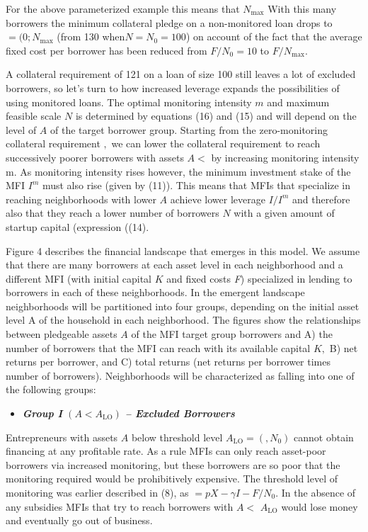 \documentclass[letterpaper, 12pt]{article}
\begin{document}
For the above parameterized example this means that \(N_{\max}\) With
this many borrowers the minimum collateral pledge on a non-monitored
loan drops to \(= (0;N_{\max}\) (from 130 when\(N = N_{0} = 100\)) on
account of the fact that the average fixed cost per borrower has been
reduced from \(F/N_{0} = 10\) to \(F/N_{\max}\).

A collateral requirement of 121 on a loan of size 100 still leaves a lot
of excluded borrowers, so let's turn to how increased leverage expands
the possibilities of using monitored loans. The optimal monitoring
intensity \(m\) and maximum feasible scale \(N\) is determined by
equations (16) and (15) and will depend on the level of \(A\) of the
target borrower group. Starting from the zero-monitoring collateral
requirement \(,\) we can lower the collateral requirement to reach
successively poorer borrowers with assets \(A <\) by increasing
monitoring intensity \(\text{m.}\) As monitoring intensity rises
however, the minimum investment stake of the MFI \(I^{m}\) must also
rise (given by (11)). This means that MFIs that specialize in reaching
neighborhoods with lower \(A\) achieve lower leverage \(I/I^{m}\) and
therefore also that they reach a lower number of borrowers \(N\) with a
given amount of startup capital (expression ((14).

Figure 4 describes the financial landscape that emerges in this model.
We assume that there are many borrowers at each asset level in each
neighborhood and a different MFI (with initial capital \(K\) and fixed
costs \emph{F}) specialized in lending to borrowers in each of these
neighborhoods. In the emergent landscape neighborhoods will be
partitioned into four groups, depending on the initial asset level A of
the household in each neighborhood. The figures show the relationships
between pledgeable assets \(A\) of the MFI target group borrowers and A)
the number of borrowers that the MFI can reach with its available
capital \(K,\) B) net returns per borrower, and C) total returns (net
returns per borrower times number of borrowers). Neighborhoods will be
characterized as falling into one of the following groups:
\begin{itemize}
\item \emph{\textbf{Group I} $(A < A_{\text{LO}})$ \textbf{-- Excluded Borrowers}} 
\end{itemize}
Entrepreneurs with assets \(A\) below threshold level
\(A_{\text{LO}} = (,N_{0})\) cannot obtain financing at any profitable
rate. As a rule MFIs can only reach asset-poor borrowers via increased
monitoring, but these borrowers are so poor that the monitoring required
would be prohibitively expensive. The threshold level of monitoring was
earlier described in (8), as \(= pX - \gamma I - F/N_{0}.\) In the
absence of any subsidies MFIs that try to reach borrowers with \(A <\)
\(A_{\text{LO}}\) would lose money and eventually go out of business.
\end{document}

